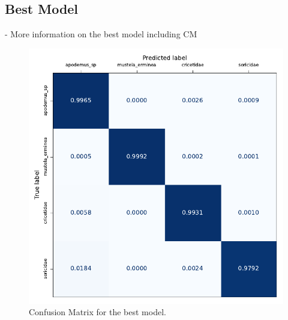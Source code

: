     \subsection{Best Model}

    - More information on the best model including CM

    

    \begin{figure}[ht]
    \centering
    \includegraphics{figures/conf_matrix_best.pdf}
    \caption{Confusion Matrix for the best model.}
    \label{fig:conf_matrix_best}
    \end{figure}
